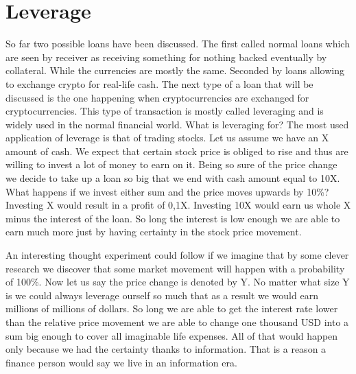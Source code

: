 \documentclass[a4paper,12pt,twoside,openany]{report}
\begin{document}
\section{Leverage}
So far two possible loans have been discussed. The first called normal loans which are seen by receiver as receiving something for nothing backed eventually by collateral. While the currencies are mostly the same.  Seconded by loans allowing to exchange crypto for real-life cash. The next type of a loan that will be discussed is the one happening when cryptocurrencies are exchanged for cryptocurrencies. This type of transaction is mostly called leveraging and is widely used in the normal financial world. What is leveraging for? The most used application of leverage is that of trading stocks. Let us assume we have an X amount of cash. We expect that certain stock price is obliged to rise and thus are willing to invest a lot of money to earn on it. Being so sure of the price change we decide to take up a loan so big that we end with cash amount equal to 10X. What happens if we invest either sum and the price moves upwards by 10\%? Investing X would result in a profit of 0,1X. Investing 10X would earn us whole X minus the interest of the loan. So long the interest is low enough we are able to earn much more just by having certainty in the stock price movement.

An interesting thought experiment could follow if we imagine that by some clever research we discover that some market movement will happen with a probability of 100\%. Now let us say the price change is denoted by Y. No matter what size Y is we could always leverage ourself so much that as a result we would earn millions of millions of dollars. So long we are able to get the interest rate lower than the relative price movement we are able to change one thousand USD into a sum big enough to cover all imaginable life expenses. All of that would happen only because we had the certainty thanks to information. That is a reason a finance person would say we live in an information era.
\end{document}
